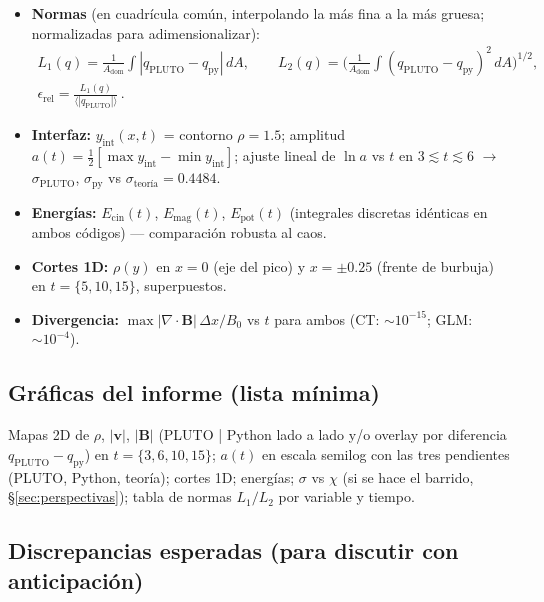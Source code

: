 \documentclass[11pt,a4paper]{article}
\newcommand{\B}{\mathbf{B}}
\newcommand{\vct}{\mathbf{v}}
\begin{document}
\begin{itemize}[nosep]
  \item \textbf{Normas} (en cuadrícula común, interpolando la más fina a la más gruesa;
  normalizadas para adimensionalizar):
  \begin{equation}
  \begin{gathered}
  L_1(q) = \frac{1}{A_\mathrm{dom}}\int |q_\mathrm{PLUTO}-q_\mathrm{py}|\,dA,
  \qquad
  L_2(q) = \Big(\frac{1}{A_\mathrm{dom}}\int (q_\mathrm{PLUTO}-q_\mathrm{py})^2\,dA\Big)^{1/2},\\[2pt]
  \epsilon_\mathrm{rel} = \frac{L_1(q)}{\langle|q_\mathrm{PLUTO}|\rangle}\,.
  \end{gathered}
  \end{equation}
  \item \textbf{Interfaz:} $y_\mathrm{int}(x,t)$ = contorno $\rho=1.5$; amplitud
  $a(t)=\tfrac12[\max y_\mathrm{int}-\min y_\mathrm{int}]$; ajuste lineal de $\ln a$ vs $t$
  en $3\lesssim t\lesssim6$ $\to$ $\sigma_\mathrm{PLUTO}$, $\sigma_\mathrm{py}$ vs
  $\sigma_\mathrm{teoría}=0.4484$.
  \item \textbf{Energías:} $E_\mathrm{cin}(t)$, $E_\mathrm{mag}(t)$, $E_\mathrm{pot}(t)$
  (integrales discretas idénticas en ambos códigos) --- comparación robusta al caos.
  \item \textbf{Cortes 1D:} $\rho(y)$ en $x=0$ (eje del pico) y $x=\pm0.25$ (frente de
  burbuja) en $t=\{5,10,15\}$, superpuestos.
  \item \textbf{Divergencia:} $\max|\nabla\cdot\B|\,\Delta x/B_0$ vs $t$ para ambos
  (CT: $\sim10^{-15}$; GLM: $\sim10^{-4}$).
\end{itemize}

\subsection{Gráficas del informe (lista mínima)}

Mapas 2D de $\rho$, $|\vct|$, $|\B|$ (PLUTO | Python lado a lado y/o overlay por
diferencia $q_\mathrm{PLUTO}-q_\mathrm{py}$) en $t=\{3,6,10,15\}$; $a(t)$ en escala
semilog con las tres pendientes (PLUTO, Python, teoría); cortes 1D; energías;
$\sigma$ vs $\chi$ (si se hace el barrido, §\ref{sec:perspectivas}); tabla de normas
$L_1/L_2$ por variable y tiempo.

\subsection{Discrepancias esperadas (para discutir con anticipación)}
\end{document}
